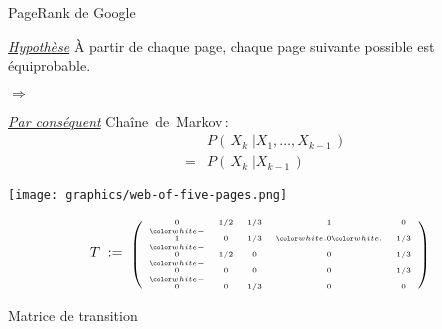 
\begin{frame}{\Large PageRank de Google}

\begin{multicols}{3}
	\begin{flushleft}
	\begin{minipage}{4.0cm}
	\begin{center}
	\underline{\textit{\small Hypoth\`ese}}
	\vskip 0.2cm
	\scriptsize\`A partir de chaque page,
	\vskip 0.1cm
	\scriptsize chaque page suivante possible
	\vskip 0.1cm
	est \;\'equiprobable.
	\end{center}
	\end{minipage}
	\end{flushleft}
\columnbreak
	\begin{center}
	\begin{minipage}{4.0cm}
	\vskip 1.0cm
	\begin{center}
	{\huge$\Longrightarrow$}
	\end{center}
	\end{minipage}
	\end{center}
\columnbreak
	\begin{flushleft}
	\begin{minipage}{3.5cm}
	\begin{center}
	\underline{\textit{\normalsize Par cons\'equent}}
	\vskip 0.2cm
	Cha\^ine \,de\, Markov\,:
	\vskip -0.65cm
	{\small\begin{eqnarray*}
	&&
		P\!\left(\,\left.X_{k}\;\right\vert X_{1},\ldots,X_{k-1}\,\right)
	\\
	& = &
		P\!\left(\,\left.X_{k}\;\right\vert X_{k-1}\,\right)
	\end{eqnarray*}}
	\end{center}
	\end{minipage}
	\end{flushleft}
\end{multicols}

\vskip 0.5cm

\begin{multicols}{2}
\pause
	\begin{minipage}{4.5cm}
	\begin{center}
	\texttt{[image: graphics/web-of-five-pages.png]}
	\end{center}
	\end{minipage}
\pause
\columnbreak
	\begin{flushright}
	\begin{minipage}{6.0cm}
	{\scriptsize\begin{equation*}
	T \; := \; \textnormal{\tiny$\TMatrix$}
	\end{equation*}}
	\begin{center}
	\vskip 0.1cm
	{\small Matrice de transition}
	\end{center}
	\end{minipage}
	\end{flushright}
\end{multicols}

\end{frame}
\normalsize

